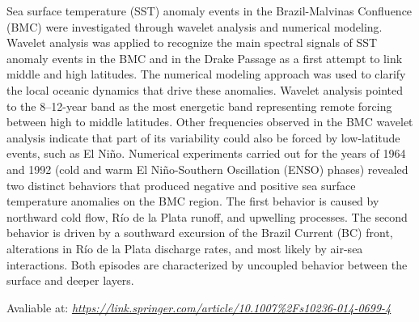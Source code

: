 Sea surface temperature (SST) anomaly events in the Brazil-Malvinas Confluence (BMC) were investigated through wavelet analysis and numerical modeling. Wavelet analysis was applied to recognize 
          the main spectral signals of SST anomaly events in the BMC and in the Drake Passage as a first attempt to link middle and high latitudes. The numerical modeling approach was used to clarify the 
          local oceanic dynamics that drive these anomalies. Wavelet analysis pointed to the 8–12-year band as the most energetic band representing remote forcing between high to middle latitudes. Other 
          frequencies observed in the BMC wavelet analysis indicate that part of its variability could also be forced by low-latitude events, such as El Niño. Numerical experiments carried out for the 
          years of 1964 and 1992 (cold and warm El Niño-Southern Oscillation (ENSO) phases) revealed two distinct behaviors that produced negative and positive sea surface temperature anomalies on the 
          BMC region. The first behavior is caused by northward cold flow, Río de la Plata runoff, and upwelling processes. The second behavior is driven by a southward excursion of the Brazil Current 
          (BC) front, alterations in Río de la Plata discharge rates, and most likely by air-sea interactions. Both episodes are characterized by uncoupled behavior between the surface and deeper layers.
\bigskip

\bigskip

 Avaliable at: \textcolor{bleu_cite}{\href{https://link.springer.com/article/10.1007\%2Fs10236-014-0699-4}{\textit{https://link.springer.com/article/10.1007\%2Fs10236-014-0699-4}}}

\bigskip
